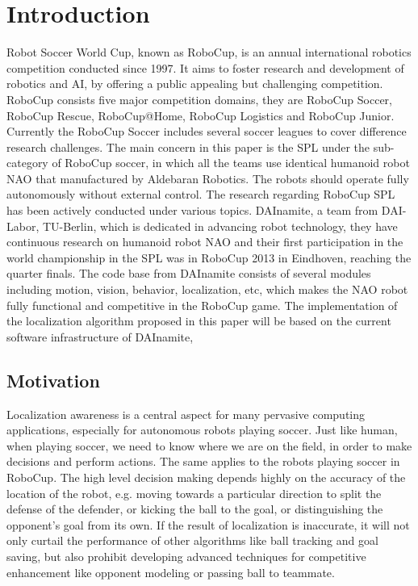 \chapter{Introduction\label{cha:chapter1}}

Robot Soccer World Cup, known as RoboCup, is an annual international robotics competition conducted since 1997. It aims to foster research and development of robotics and \gls{AI}, by offering a public appealing but challenging competition. RoboCup consists five major competition domains, they are RoboCup Soccer, RoboCup Rescue, RoboCup@Home, RoboCup Logistics and RoboCup Junior. Currently the RoboCup Soccer includes several soccer leagues to cover difference research challenges. The main concern in this paper is the \gls{SPL} under the sub-category of RoboCup soccer, in which all the teams use identical humanoid robot NAO that manufactured by Aldebaran Robotics{\textregistered}. The robots should operate fully autonomously without external control. 
The research regarding RoboCup \gls{SPL} has been actively conducted under various topics. DAInamite, a team from DAI-Labor, TU-Berlin, which is dedicated in advancing robot technology, they have continuous research on humanoid robot NAO and their first participation in the world championship in the \gls{SPL} was in RoboCup 2013 in Eindhoven, reaching the quarter finals. The code base from DAInamite consists of several modules including motion, vision, behavior, localization, etc, which makes the NAO robot fully functional and competitive in the RoboCup game.
The implementation of the localization algorithm proposed in this paper will be based on the current software infrastructure of DAInamite,  

\section{Motivation\label{sec:moti}}
Localization awareness is a central aspect for many pervasive computing applications, especially for autonomous robots playing soccer. Just like human,  when playing soccer, we need to know where we are on the field, in order to make decisions and perform actions. The same applies to the robots playing soccer in RoboCup. The high level decision making depends highly on the accuracy of the location of the robot, e.g. moving towards a particular direction to split the defense of the defender, or kicking the ball to the goal, or distinguishing the opponent's goal from its own. If the result of localization is inaccurate, it will not only curtail the performance of other algorithms like ball tracking and goal saving, but also prohibit developing advanced techniques for competitive enhancement like opponent modeling or passing ball to teammate. 

